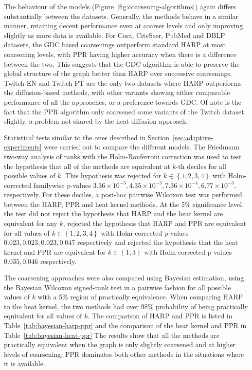 \documentclass[sn-mathphys,pdflatex,iicol]{sn-jnl}%
\begin{document}
The behaviour of the models (Figure~\ref{fig:coarsening-algorithms}) again differs substantially between the datasets. Generally, the methods behave in a similar manner, retaining decent performance even at coarser levels and only improving slightly as more data is available. For Cora, CiteSeer, PubMed and DBLP datasets, the GDC based coarsenings outperform standard HARP at most coarsening levels, with PPR having higher accuracy when there is a difference between the two. This suggests that the GDC algorithm is able to preserve the global structure of the graph better than HARP over successive coarsenings. Twitch-EN and Twitch-PT are the only two datasets where HARP outperforms the diffusion-based methods, with other variants showing either comparable performance of all the approaches, or a preference towards GDC. Of note is the fact that the PPR algorithm only coarsened some variants of the Twitch dataset slightly, a problem not shared by the heat diffusion approach.

Statistical tests similar to the ones described in Section~\ref{sec:adaptive-experiments} were carried out to compare the different models. The Friedmann two-way analysis of ranks with the Holm-Bonferroni correction was used to test the hypothesis that all of the methods are equivalent at \( k \)-th deciles for all possible values of \( k \). This hypothesis was rejected for \( k \in \left\{ 1, 2, 3, 4 \right\} \) with Holm-corrected familywise p-values \( 3.36 \times 10^{-3}, 4.35 \times 10^{-3}, 7.36 \times 10^{-4}, 6.77 \times 10^{-3} \), respectively. For these deciles, a post-hoc pairwise Wilcoxon test was performed between the HARP, PPR and heat kernel methods. At the 5\% significance level, the test did not reject the hypothesis that HARP and the heat kernel are equivalent for any \( k \), rejected the hypothesis that HARP and PPR are equivalent for all values of \( k \in \left\{ 1, 2, 3, 4 \right\} \) with Holm-corrected p-values \( 0.023, 0.023, 0.023, 0.047 \) respectively and rejected the hypothesis that the heat kernel and PPR are equivalent for \( k \in \left\{ 1, 3 \right\} \) with Holm-corrected p-values \( 0.035, 0.046 \) respectively.

The coarsening approaches were also compared using Bayesian estimation, using the Bayesian Wilcoxon signed-rank test in a pairwise fashion for all possible values of \( k \) with a 5\% region of practically equivalence. When comparing HARP to the heat kernel, the two methods had over 98\% probability of being practically equivalent for all values of \( k \). The comparison of HARP and PPR is listed in Table~\ref{tab:bayesian-harp-ppr} and the comparison of the heat kernel and PPR in Table~\ref{tab:bayesian-heat-ppr} The results show that all the methods are practically equivalent when the graph is only slightly coarsened and at higher levels of coarsening, PPR dominates both other methods in the situations where it is available.
\end{document}
